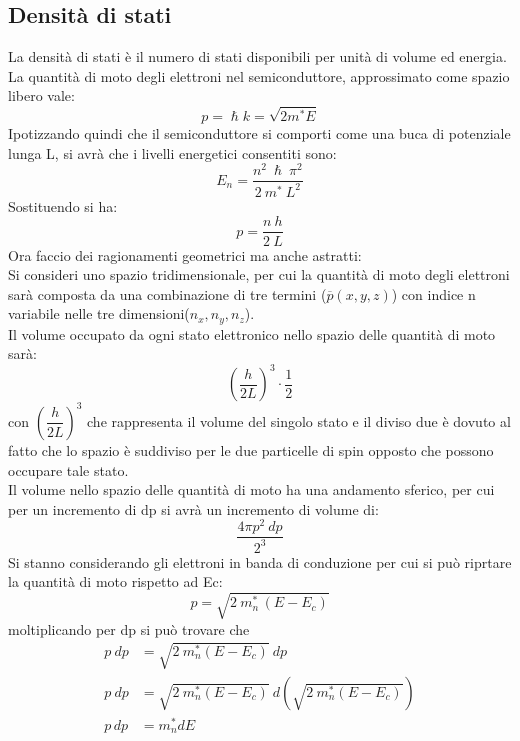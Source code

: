 \subsection{Densità di stati}
La densità di stati è il numero di stati disponibili per unità di volume ed energia.\\
La quantità di moto degli elettroni nel semiconduttore, approssimato come spazio libero vale:
\begin{equation}
    p=\hslash k = \sqrt{2m^*E}
\end{equation}
Ipotizzando quindi che il semiconduttore si comporti come una buca di potenziale lunga L, si avrà che i livelli energetici consentiti sono:
\begin{equation}
    E_n=\dfrac{n^2\ \hslash \ \pi^2}{2\ m^* \ L^2}
\end{equation}
Sostituendo si ha:
\begin{equation}
    p=\dfrac{n\ h}{2\ L}
\end{equation}
Ora faccio dei ragionamenti geometrici ma anche astratti:\\
Si consideri uno spazio tridimensionale, per cui la quantità di moto degli elettroni sarà composta da una combinazione di tre termini ($\overline{p}(x,y,z)$) con indice n variabile nelle tre dimensioni($ n_x, n_y, n_z$).\\
Il volume occupato da ogni stato elettronico nello spazio delle quantità di moto sarà:
%
\begin{equation}
    \left( \dfrac{h}{2L}\right)^3 \cdot \dfrac{1}{2}
\end{equation}
%
con $\left( \dfrac{h}{2L}\right)^3$ che rappresenta il volume del singolo stato e il diviso due è dovuto al fatto che lo spazio è suddiviso per le due particelle di spin opposto che possono occupare tale stato.\\
%
Il volume nello spazio delle quantità di moto ha una andamento sferico, per cui per un incremento di dp si avrà un incremento di volume di:
\begin{equation}
    \dfrac{4\pi p^2\ dp}{2^3}
\end{equation}
%
Si stanno considerando gli elettroni in banda di conduzione per cui si può riprtare la quantità di moto rispetto ad Ec:
%
\begin{equation}
    p=\sqrt{2\ m_n^* \,(E-E_c)}
\end{equation}
%
moltiplicando per dp si può trovare che
%
\begin{align}
    p\ dp & =\sqrt{2\ m_n^*(E-E_c)}\ dp \nonumber \\
    p\ dp & =\sqrt{2\ m_n^*(E-E_c)}\ d\left(\sqrt{2\ m_n^*(E-E_c)}\right) \nonumber\\
    p\,dp &= m_n^* dE
\end{align}
